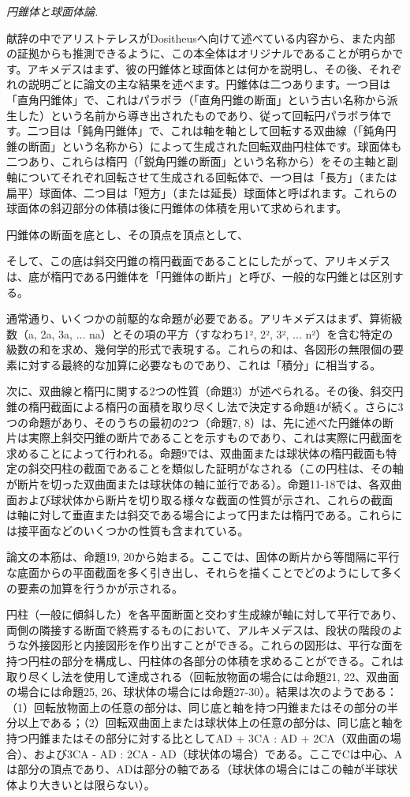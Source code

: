 \documentclass[a4paper,11pt,openany]{ltjsbook}
\begin{document}
\textit{円錐体と球面体論.}

献辞の中でアリストテレスがDositheusへ向けて述べている内容から、また内部の証拠からも推測できるように、この本全体はオリジナルであることが明らかです。アキメデスはまず、彼の円錐体と球面体とは何かを説明し、その後、それぞれの説明ごとに論文の主な結果を述べます。円錐体は二つあります。一つ目は「直角円錐体」で、これはパラボラ（「直角円錐の断面」という古い名称から派生した）という名前から導き出されたものであり、従って回転円パラボラ体です。二つ目は「鈍角円錐体」で、これは軸を軸として回転する双曲線（「鈍角円錐の断面」という名称から）によって生成された回転双曲円柱体です。球面体も二つあり、これらは楕円（「鋭角円錐の断面」という名称から）をその主軸と副軸についてそれぞれ回転させて生成される回転体で、一つ目は「長方」（または扁平）球面体、二つ目は「短方」（または延長）球面体と呼ばれます。これらの球面体の斜辺部分の体積は後に円錐体の体積を用いて求められます。

円錐体の断面を底とし、その頂点を頂点として、

そして、この底は斜交円錐の楕円截面であることにしたがって、アリキメデスは、底が楕円である円錐体を「円錐体の断片」と呼び、一般的な円錐とは区別する。

通常通り、いくつかの前駆的な命題が必要である。アリキメデスはまず、算術級数（a, 2a, 3a, ... na）とその項の平方（すなわち1², 2², 3², ... n²）を含む特定の級数の和を求め、幾何学的形式で表現する。これらの和は、各図形の無限個の要素に対する最終的な加算に必要なものであり、これは「積分」に相当する。

次に、双曲線と楕円に関する2つの性質（命題3）が述べられる。その後、斜交円錐の楕円截面による楕円の面積を取り尽くし法で決定する命題4が続く。さらに3つの命題があり、そのうちの最初の2つ（命題7, 8）は、先に述べた円錐体の断片は実際上斜交円錐の断片であることを示すものであり、これは実際に円截面を求めることによって行われる。命題9では、双曲面または球状体の楕円截面も特定の斜交円柱の截面であることを類似した証明がなされる（この円柱は、その軸が断片を切った双曲面または球状体の軸に並行である）。命題11-18では、各双曲面および球状体から断片を切り取る様々な截面の性質が示され、これらの截面は軸に対して垂直または斜交である場合によって円または楕円である。これらには接平面などのいくつかの性質も含まれている。

論文の本筋は、命題19, 20から始まる。ここでは、固体の断片から等間隔に平行な底面からの平面截面を多く引き出し、それらを描くことでどのようにして多くの要素の加算を行うかが示される。

円柱（一般に傾斜した）を各平面断面と交わす生成線が軸に対して平行であり、両側の隣接する断面で終焉するものにおいて、アルキメデスは、段状の階段のような外接図形と内接図形を作り出すことができる。これらの図形は、平行な面を持つ円柱の部分を構成し、円柱体の各部分の体積を求めることができる。これは取り尽くし法を使用して達成される（回転放物面の場合には命題21, 22、双曲面の場合には命題25, 26、球状体の場合には命題27-30）。結果は次のようである：（1）回転放物面上の任意の部分は、同じ底と軸を持つ円錐またはその部分の半分以上である；（2）回転双曲面上または球状体上の任意の部分は、同じ底と軸を持つ円錐またはその部分に対する比としてAD + 3CA : AD + 2CA（双曲面の場合）、および3CA - AD : 2CA - AD（球状体の場合）である。ここでCは中心、Aは部分の頂点であり、ADは部分の軸である（球状体の場合にはこの軸が半球状体より大きいとは限らない）。
\end{document}
